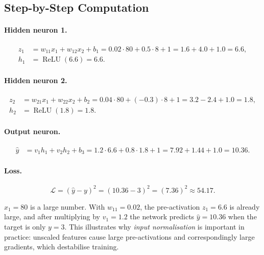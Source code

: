 \documentclass[12pt,a4paper]{article}
\newcommand{\Loss}{\mathcal{L}}
\newcommand{\yhat}{\hat{y}}
\newcommand{\ReLU}{\operatorname{ReLU}}
\begin{document}
\subsection{Step-by-Step Computation}

\paragraph{Hidden neuron 1.}
\begin{align}
  z_1 &= w_{11} x_1 + w_{12} x_2 + b_1
       = 0.02\cdot80 + 0.5\cdot8 + 1
       = 1.6 + 4.0 + 1.0 = 6.6, \label{eq:z1}\\
  h_1 &= \ReLU(6.6) = 6.6. \label{eq:h1}
\end{align}

\paragraph{Hidden neuron 2.}
\begin{align}
  z_2 &= w_{21} x_1 + w_{22} x_2 + b_2
       = 0.04\cdot80 + (-0.3)\cdot8 + 1
       = 3.2 - 2.4 + 1.0 = 1.8, \label{eq:z2}\\
  h_2 &= \ReLU(1.8) = 1.8. \label{eq:h2}
\end{align}

\paragraph{Output neuron.}
\begin{align}
  \yhat &= v_1 h_1 + v_2 h_2 + b_3
         = 1.2\cdot6.6 + 0.8\cdot1.8 + 1
         = 7.92 + 1.44 + 1.0 = 10.36. \label{eq:yhat}
\end{align}

\paragraph{Loss.}
\begin{equation}
  \Loss = (\yhat - y)^2 = (10.36 - 3)^2 = (7.36)^2 \approx 54.17.
  \label{eq:loss-val}
\end{equation}

\begin{example}
$x_1 = 80$ is a large number.
With $w_{11} = 0.02$, the pre-activation $z_1 = 6.6$ is already large,
and after multiplying by $v_1 = 1.2$ the network predicts $\yhat = 10.36$
when the target is only $y = 3$.
This illustrates why \emph{input normalisation} is important in practice:
unscaled features cause large pre-activations and correspondingly large
gradients, which destabilise training.
\end{example}
\end{document}
